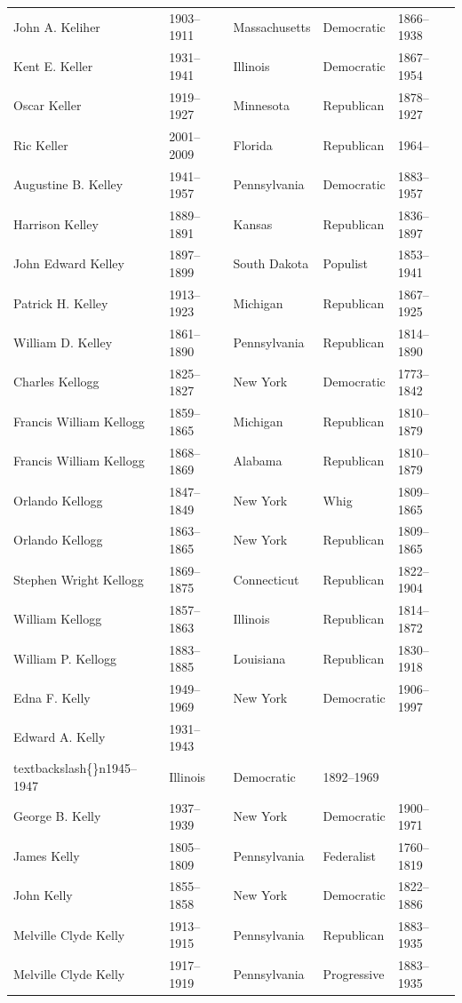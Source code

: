 \documentclass{article}
\begin{document}
\begin{tabular}{lllll}
John A. Keliher & 1903–1911 & Massachusetts & Democratic & 1866–1938 \\
Kent E. Keller & 1931–1941 & Illinois & Democratic & 1867–1954 \\
Oscar Keller & 1919–1927 & Minnesota & Republican & 1878–1927 \\
Ric Keller & 2001–2009 & Florida & Republican & 1964– \\
Augustine B. Kelley & 1941–1957 & Pennsylvania & Democratic & 1883–1957 \\
Harrison Kelley & 1889–1891 & Kansas & Republican & 1836–1897 \\
John Edward Kelley & 1897–1899 & South Dakota & Populist & 1853–1941 \\
Patrick H. Kelley & 1913–1923 & Michigan & Republican & 1867–1925 \\
William D. Kelley & 1861–1890 & Pennsylvania & Republican & 1814–1890 \\
Charles Kellogg & 1825–1827 & New York & Democratic & 1773–1842 \\
Francis William Kellogg & 1859–1865 & Michigan & Republican & 1810–1879 \\
Francis William Kellogg & 1868–1869 & Alabama & Republican & 1810–1879 \\
Orlando Kellogg & 1847–1849 & New York & Whig & 1809–1865 \\
Orlando Kellogg & 1863–1865 & New York & Republican & 1809–1865 \\
Stephen Wright Kellogg & 1869–1875 & Connecticut & Republican & 1822–1904 \\
William Kellogg & 1857–1863 & Illinois & Republican & 1814–1872 \\
William P. Kellogg & 1883–1885 & Louisiana & Republican & 1830–1918 \\
Edna F. Kelly & 1949–1969 & New York & Democratic & 1906–1997 \\
Edward A. Kelly & 1931–1943\\textbackslash\{\}n1945–1947 & Illinois & Democratic & 1892–1969 \\
George B. Kelly & 1937–1939 & New York & Democratic & 1900–1971 \\
James Kelly & 1805–1809 & Pennsylvania & Federalist & 1760–1819 \\
John Kelly & 1855–1858 & New York & Democratic & 1822–1886 \\
Melville Clyde Kelly & 1913–1915 & Pennsylvania & Republican & 1883–1935 \\
Melville Clyde Kelly & 1917–1919 & Pennsylvania & Progressive & 1883–1935 \\

\end{tabular}
\end{document}
